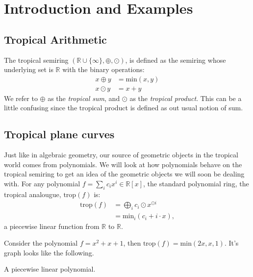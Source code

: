 \section{Introduction and Examples}
\subsection{Tropical Arithmetic}
    \begin{definition} The tropical semiring $(\mathbb{R} \cup \{\infty\}, \oplus, \odot)$, is defined as the semiring whose underlying set is $\mathbb{R}$ with the binary operations: 
        \begin{align*}
            x \oplus y &= \text{min}(x,y)\\
            x \odot y  &= x + y
        \end{align*}
    We refer to $\oplus$ as the \textit{tropical sum}, and $\odot$ as the \textit{tropical product}. This can be a little confusing since the tropical product is defined as out usual notion of sum.
    \end{definition}

\subsection{Tropical plane curves}
Just like in algebraic geometry, our source of geometric objects in the tropical world comes from polynomials.
We will look at how polynomials behave on the tropical semiring to get an idea of the geometric objects we will soon be dealing with.
For any polynomial $f  = \sum_{i}c_{i}x^{i}\in \mathbb{R}[x]$, the standard polynomial ring, the tropical analougue, $\text{trop}(f)$ is:
\begin{align*}
    \text{trop}(f) &= \bigoplus_{i}c_{i}\odot x^{\odot i}\\
                   &= \text{min}_{i}(c_{i} + i \cdot x),
\end{align*}
a piecewise linear function from $\mathbb{R}$ to $\mathbb{R}$.

\begin{example}
    Consider the polynomial $f = x^{2} + x + 1$, then $\text{trop}(f) = \text{min}(2x,x,1)$. It's graph looks like the following.
    \begin{center}
    \end{center}
    A piecewise linear polynomial.
\end{example}

